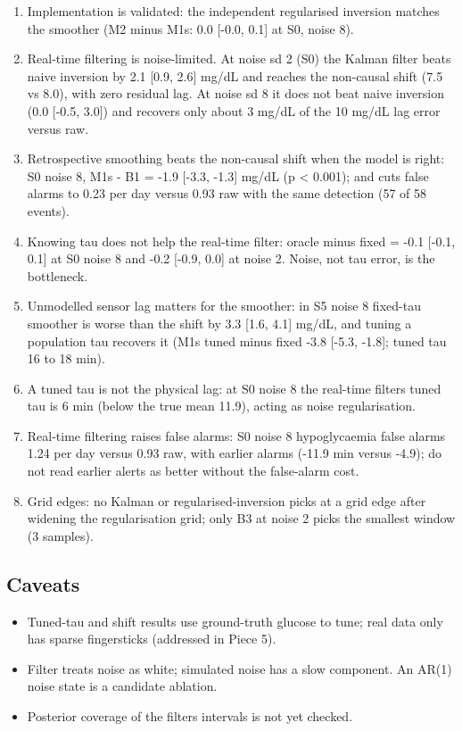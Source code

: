 \documentclass[11pt,a4paper]{article}
\providecommand{\tightlist}{\setlength{\itemsep}{0pt}\setlength{\parskip}{0pt}}
\begin{document}
\begin{enumerate}
\def\labelenumi{\arabic{enumi}.}
\tightlist
\item
  Implementation is validated: the independent regularised inversion
  matches the smoother (M2 minus M1s: 0.0 {[}-0.0, 0.1{]} at S0, noise
  8).
\item
  Real-time filtering is noise-limited. At noise sd 2 (S0) the Kalman
  filter beats naive inversion by 2.1 {[}0.9, 2.6{]} mg/dL and reaches
  the non-causal shift (7.5 vs 8.0), with zero residual lag. At noise sd
  8 it does not beat naive inversion (0.0 {[}-0.5, 3.0{]}) and recovers
  only about 3 mg/dL of the 10 mg/dL lag error versus raw.
\item
  Retrospective smoothing beats the non-causal shift when the model is
  right: S0 noise 8, M1s - B1 = -1.9 {[}-3.3, -1.3{]} mg/dL (p
  \textless{} 0.001); and cuts false alarms to 0.23 per day versus 0.93
  raw with the same detection (57 of 58 events).
\item
  Knowing tau does not help the real-time filter: oracle minus fixed =
  -0.1 {[}-0.1, 0.1{]} at S0 noise 8 and -0.2 {[}-0.9, 0.0{]} at noise
  2. Noise, not tau error, is the bottleneck.
\item
  Unmodelled sensor lag matters for the smoother: in S5 noise 8
  fixed-tau smoother is worse than the shift by 3.3 {[}1.6, 4.1{]}
  mg/dL, and tuning a population tau recovers it (M1s tuned minus fixed
  -3.8 {[}-5.3, -1.8{]}; tuned tau 16 to 18 min).
\item
  A tuned tau is not the physical lag: at S0 noise 8 the real-time
  filter\textquotesingle s tuned tau is 6 min (below the true mean
  11.9), acting as noise regularisation.
\item
  Real-time filtering raises false alarms: S0 noise 8 hypoglycaemia
  false alarms 1.24 per day versus 0.93 raw, with earlier alarms (-11.9
  min versus -4.9); do not read earlier alerts as better without the
  false-alarm cost.
\item
  Grid edges: no Kalman or regularised-inversion picks at a grid edge
  after widening the regularisation grid; only B3 at noise 2 picks the
  smallest window (3 samples).
\end{enumerate}

\hypertarget{caveats}{%
\subsection{Caveats}\label{caveats}}

\begin{itemize}
\tightlist
\item
  Tuned-tau and shift results use ground-truth glucose to tune; real
  data only has sparse fingersticks (addressed in Piece 5).
\item
  Filter treats noise as white; simulated noise has a slow component. An
  AR(1) noise state is a candidate ablation.
\item
  Posterior coverage of the filter\textquotesingle s intervals is not
  yet checked.
\end{itemize}
\end{document}
